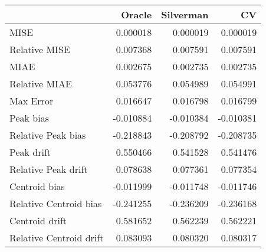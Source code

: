 \begin{tabular}{lrrr}
  \hline
 & Oracle & Silverman & CV \\ 
  \hline
MISE & 0.000018 & 0.000019 & 0.000019 \\ 
  Relative MISE & 0.007368 & 0.007591 & 0.007591 \\ 
  MIAE & 0.002675 & 0.002735 & 0.002735 \\ 
  Relative MIAE & 0.053776 & 0.054989 & 0.054991 \\ 
  Max Error & 0.016647 & 0.016798 & 0.016799 \\ 
  Peak bias & -0.010884 & -0.010384 & -0.010381 \\ 
  Relative Peak bias & -0.218843 & -0.208792 & -0.208735 \\ 
  Peak drift & 0.550466 & 0.541528 & 0.541476 \\ 
  Relative Peak drift & 0.078638 & 0.077361 & 0.077354 \\ 
  Centroid bias & -0.011999 & -0.011748 & -0.011746 \\ 
  Relative Centroid bias & -0.241255 & -0.236209 & -0.236168 \\ 
  Centroid drift & 0.581652 & 0.562239 & 0.562221 \\ 
  Relative Centroid drift & 0.083093 & 0.080320 & 0.080317 \\ 
   \hline
\end{tabular}
